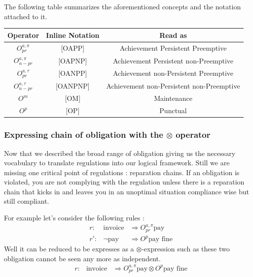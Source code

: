 \documentclass[10pt]{report}
\begin{document}
The following table summarizes the aforementioned concepts and the notation attached to it.


\begin{center}
\begin{tabular}{c|c|c}
Operator & Inline Notation & Read as \\
\hline
$O^{a, \pi}_{pr}$     & [OAPP]  & Achievement Persistent Preemptive            \\
$O^{a, \pi}_{n-pr}$   & [OAPNP] & Achievement Persistent non-Preemptive        \\
$O^{a, \tau}_{pr}$    & [OANPP]  & Achievement non-Persistent Preemptive        \\
$O^{a, \tau}_{n-pr}$  & [OANPNP]  & Achievement non-Persistent non-Preemptive    \\
$O^{m}$               & [OM]  & Maintenance                                  \\
$O^{p}$               & [OP]  & Punctual                                     \\
\end{tabular}
\end{center}

\subsubsection{Expressing chain of obligation with the $\otimes$ operator}

Now that we described the broad range of obligation giving us the necessary vocabulary to translate regulations into our logical framework. Still we are missing one critical point of regulations : reparation chains. If an obligation is violated, you are not complying with the regulation unless there is a reparation chain that kicks in and leaves you in an unoptimal situation compliance wise but still compliant.

 For example let's consider the following rules : 
 \[
 \begin{aligned}
   & r : &\text{invoice} & \Rightarrow O^{a, \pi}_{pr}\text{pay}\\
   & r': &\neg \text{pay} & \Rightarrow O^{p}\text{pay fine}
 \end{aligned}
 \]
 Well it can be reduced to be expresses as a $\otimes$-expression such as these two obligation cannot be seen any more as independent. 
  \[
 \begin{aligned}
   & r : &\text{invoice} & \Rightarrow O^{a, \pi}_{pr}\text{pay} \otimes O^{p}\text{pay fine}\\
 \end{aligned}
 \]
\end{document}
